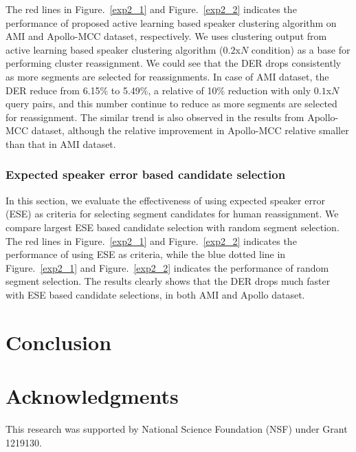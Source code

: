 \documentclass[journal]{IEEEtran}
\begin{document}
The red lines in Figure.~\ref{exp2_1} and Figure.~\ref{exp2_2} indicates the performance of proposed active learning based speaker clustering algorithm on AMI and Apollo-MCC dataset, respectively. We uses clustering output from active learning based speaker clustering algorithm ($0.2$x$N$ condition) as a base for performing cluster reassignment. We could see that the DER drops consistently as more segments are selected for reassignments. In case of AMI dataset, the DER reduce from 6.15\% to 5.49\%, a relative of 10\% reduction with only $0.1$x$N$ query pairs, and this number continue to reduce as more segments are selected for reassignment. The similar trend is also observed in the results from Apollo-MCC dataset, although the relative improvement in Apollo-MCC relative smaller than that in AMI dataset.

\subsubsection{Expected speaker error based candidate selection}
In this section, we evaluate the effectiveness of using expected speaker error (ESE) as criteria for selecting segment candidates for human reassignment. We compare largest ESE based candidate selection with random segment selection. The red lines in Figure.~\ref{exp2_1} and Figure.~\ref{exp2_2} indicates the performance of using ESE as criteria, while the blue dotted line in Figure.~\ref{exp2_1} and Figure.~\ref{exp2_2} indicates the performance of random segment selection. The results clearly shows that the DER drops much faster with ESE based candidate selections, in both AMI and Apollo dataset.

\section{Conclusion}

\section*{Acknowledgments}
This research was supported by National Science Foundation (NSF) under Grant 1219130.
 



\end{document}
